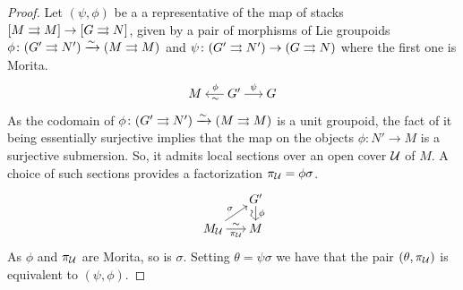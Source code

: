 \begin{proof}
Let $(\psi, \phi)$ be a a representative of the map of stacks $[M\rightrightarrows M]\to [G\rightrightarrows N]$, given by a pair of morphisms of Lie groupoids $\phi\colon (G'\rightrightarrows N') \xrightarrow{\sim} (M\rightrightarrows M)$ and $\psi\colon (G'\rightrightarrows N') \to (G\rightrightarrows N)$ where the first one is Morita.
\begin{equation}
\begin{tikzcd}[sep = small]
  M & G' \ar[shorten = -.15em]{l}[pos=.45, sloped, below]{\sim}[pos=.45, sloped, above]{\phi} \ar[shorten = -.15em]{r}{\psi} & G
\end{tikzcd}
\end{equation}
As the codomain of $\phi\colon (G'\rightrightarrows N') \xrightarrow{\sim} (M\rightrightarrows M)$ is a unit groupoid, the fact of it being essentially surjective implies that the map on the objects $\phi\colon N'\to M$ is a surjective submersion.
So, it admits local sections over an open cover $\mathcal{U}$ of $M$.
A choice of such sections provides a factorization $\pi_{\mathcal{U}} = \phi\sigma$.
\begin{equation}
\begin{tikzcd}[sep = small]
  & G' \ar[shorten = -.15em]{d}{\phi}[sloped, below]{\sim} \\
  M_\U \ar[shorten = -.2em]{r}[below]{\pi_\U}[above]{\sim} \ar[shorten = -.3em]{ur}{\sigma} & M
\end{tikzcd}
\end{equation}
As $\phi$ and $\pi_{\mathcal{U}}$ are Morita, so is $\sigma$.
Setting $\theta = \psi\sigma$ we have that the pair $(\theta, \pi_{\mathcal{U}})$ is equivalent to $(\psi, \phi)$.
\end{proof}

